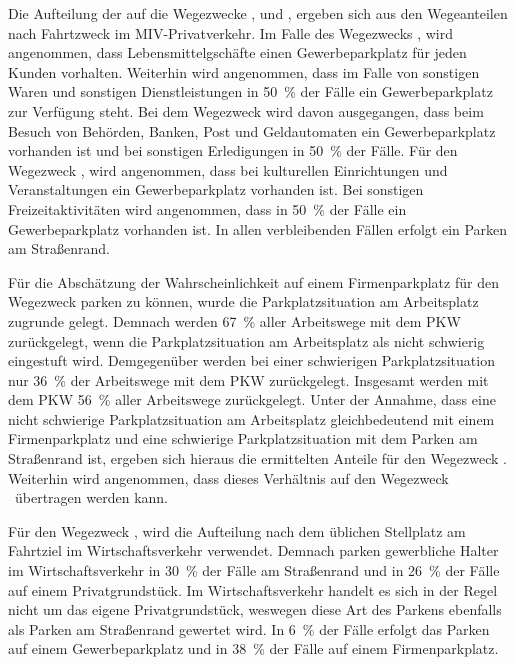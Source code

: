 Die Aufteilung der \UCs auf die Wegezwecke \Einkaufdot, \Erledigung und \Freizeitdot, ergeben sich aus den Wegeanteilen nach Fahrtzweck im \gls{MIV}-Privatverkehr. \cite{Rikus2015}
Im Falle des Wegezwecks \Einkauf, wird angenommen, dass Lebensmittelgschäfte einen Gewerbeparkplatz für jeden Kunden vorhalten.
Weiterhin wird angenommen, dass im Falle von sonstigen Waren und sonstigen Dienstleistungen in \SI{50}{\percent} der Fälle ein Gewerbeparkplatz zur Verfügung steht.
Bei dem Wegezweck \Erledigung wird davon ausgegangen, dass beim Besuch von Behörden, Banken, Post und Geldautomaten ein Gewerbeparkplatz vorhanden ist und bei sonstigen Erledigungen in \SI{50}{\percent} der Fälle.
Für den Wegezweck \Freizeitdot, wird angenommen, dass bei kulturellen Einrichtungen und Veranstaltungen ein Gewerbeparkplatz vorhanden ist.
Bei sonstigen Freizeitaktivitäten wird angenommen, dass in \SI{50}{\percent} der Fälle ein Gewerbeparkplatz vorhanden ist.
In allen verbleibenden Fällen erfolgt ein Parken am Straßenrand.\medskip

Für die Abschätzung der Wahrscheinlichkeit auf einem Firmenparkplatz für den Wegezweck \Arbeit parken zu können, wurde die Parkplatzsituation am Arbeitsplatz zugrunde gelegt.
Demnach werden \SI{67}{\percent} aller Arbeitswege mit dem \gls{PKW} zurückgelegt, wenn die Parkplatzsituation am Arbeitsplatz als nicht schwierig eingestuft wird.
Demgegenüber werden bei einer schwierigen Parkplatzsituation nur \SI{36}{\percent} der Arbeitswege mit dem \gls{PKW} zurückgelegt.
Insgesamt werden mit dem \gls{PKW} \SI{56}{\percent} aller Arbeitswege zurückgelegt. \cite{Ecke2020}
Unter der Annahme, dass eine nicht schwierige Parkplatzsituation am Arbeitsplatz gleichbedeutend mit einem Firmenparkplatz und eine schwierige Parkplatzsituation mit dem Parken am Straßenrand ist, ergeben sich hieraus die ermittelten Anteile für den Wegezweck \Arbeitdot.
Weiterhin wird angenommen, dass dieses Verhältnis auf den Wegezweck \Ausbildung~übertragen werden kann.\medskip

Für den Wegezweck \dienstdot, wird die Aufteilung nach dem üblichen Stellplatz am Fahrtziel im Wirtschaftsverkehr verwendet. \cite{Rikus2015}
Demnach parken gewerbliche Halter im Wirtschaftsverkehr in \SI{30}{\percent} der Fälle am Straßenrand und in \SI{26}{\percent} der Fälle auf einem Privatgrundstück.
Im Wirtschaftsverkehr handelt es sich in der Regel nicht um das eigene Privatgrundstück, weswegen diese Art des Parkens ebenfalls als Parken am Straßenrand gewertet wird.
In \SI{6}{\percent} der Fälle erfolgt das Parken auf einem Gewerbeparkplatz und in \SI{38}{\percent} der Fälle auf einem Firmenparkplatz.\medskip

